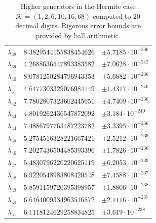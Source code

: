 \documentclass[a4paper,10pt]{article}
\begin{document}
\begin{appendix}
\begin{table}[h]
\begin{tabular}{|l|ll|}
  $\lambda_{38}$ & $8.3829544155838454626$  & $\pm 5.7185 \cdot 10^{-236}$ \\
  $\lambda_{39}$ & $4.2688636547893383582$  & $\pm 7.0628 \cdot 10^{-242}$ \\
  $\lambda_{40}$ & $8.0781250284796943353$  & $\pm 5.6882 \cdot 10^{-236}$ \\
  $\lambda_{41}$ & $4.6477303329076984149$  & $\pm 1.4317 \cdot 10^{-240}$ \\
  $\lambda_{42}$ & $7.7802807323602445651$  & $\pm 4.7409 \cdot 10^{-236}$ \\
  $\lambda_{43}$ & $4.8019262436547872092$  & $\pm 3.184 \cdot 10^{-240}$ \\
  $\lambda_{44}$ & $7.4886797763487223782$  & $\pm 3.3395 \cdot 10^{-236}$ \\
  $\lambda_{45}$ & $5.2754516328221667421$  & $\pm 2.5212 \cdot 10^{-239}$ \\
  $\lambda_{46}$ & $7.2027436504485393396$  & $\pm 1.7826 \cdot 10^{-236}$ \\
  $\lambda_{47}$ & $5.4830796220220625119$  & $\pm 6.2053 \cdot 10^{-239}$ \\
  $\lambda_{48}$ & $6.9220548983808420548$  & $\pm 7.4588 \cdot 10^{-237}$ \\
  $\lambda_{49}$ & $5.8591159720395398957$  & $\pm 1.8806 \cdot 10^{-238}$ \\
  $\lambda_{50}$ & $6.6464009334963516572$  & $\pm 2.1116 \cdot 10^{-237}$ \\
  $\lambda_{51}$ & $6.1118124629258834825$  & $\pm 3.619 \cdot 10^{-238}$ \\
  \hline
  \end{tabular}
  \caption{Higher generators in the Hermite case $\mathcal{K} = (1, 2, 6, 10, 16, 68)$
  computed to 20 decimal digits. Rigorous error bounds are provided by ball
  arithmetic.}
\end{table}

\end{appendix}

\FloatBarrier


\end{document}
